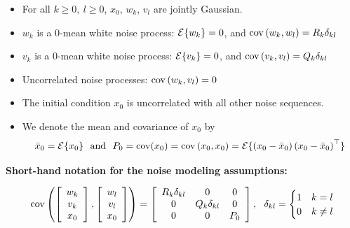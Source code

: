 \begin{itemize}
\setlength{\itemsep}{.5cm}
\item  For all $k\ge 0,~l\ge 0$, $x_0$, $w_k$, $v_l$ are jointly Gaussian.

\item $w_k$ is a 0-mean white noise process: ${\cal E} \{ w_k \}=0$, and $\mathrm{cov} \left(w_k,w_l\right)= R_k \delta_{kl}$

\item $v_k$ is a 0-mean white noise process: ${\cal E} \{ v_k \}=0$, and $\mathrm{cov} \left(v_k,v_l\right)= Q_k \delta_{kl}$

\item Uncorrelated noise processes: $\mathrm{cov} \left(w_k,v_l\right) = 0$

\item The initial condition $x_0$ is uncorrelated with all other noise sequences.

\item We denote the mean and covariance of $x_0$ by
$$\bar{x}_0 = {\cal E} \{ x_0 \}~~\mbox{and}~~ P_0 = \mathrm{cov}(x_0)=\mathrm{cov} \left(x_0,x_0\right)= {\cal E} \{  \left(x_0-\bar{x}_0\right) \left(x_0-\bar{x}_0\right)^\top  \}$$

\end{itemize}



\textbf{Short-hand notation for the noise modeling assumptions:}

$$\mathrm{cov} \left( \left[ \begin{array}{c} w_k\\ v_k \\ x_0 \end{array}  \right], \left[ \begin{array}{c} w_l\\ v_l \\ x_0 \end{array}  \right] \right) =
 \left[ \begin{array}{ccc} R_k \delta_{kl} & 0 &0 \\ 0 & Q_k \delta_{kl} & 0\\ 0 & 0& P_0 \end{array}  \right],~~\delta_{kl}=\begin{cases} 1 &k=l \\0 & k\not= l \end{cases}$$\\



